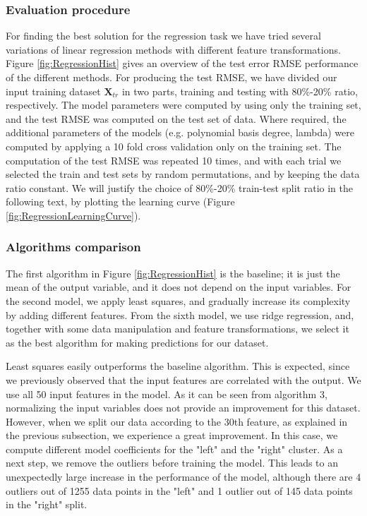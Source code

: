 \documentclass{article} %
\begin{document}
\subsubsection{Evaluation procedure}

For finding the best solution for the regression task we have tried several
variations of linear regression methods with different feature
transformations.
Figure \ref{fig:RegressionHist} gives an overview of the test error RMSE performance of the different methods. 
For producing the test RMSE, we have divided our input training dataset $\mathbf{X}_{tr}$ in two parts, 
training and testing with 80\%-20\% ratio, respectively. 
The model parameters were computed by using only the training set, 
and the test RMSE was computed on the test set of data.
 Where required, the additional parameters of the models (e.g. polynomial basis degree, lambda) 
 were computed by applying a 10 fold cross validation only on the training set. 
 The computation of the test RMSE was repeated 10 times, and with 
 each trial we selected the train and test sets by random permutations, and by
  keeping the data ratio constant. 
  We will justify the choice of 80\%-20\% train-test split ratio in the following text,
   by plotting the learning curve (Figure \ref{fig:RegressionLearningCurve}).

\subsubsection{Algorithms comparison}

The first algorithm in Figure \ref{fig:RegressionHist} is the baseline; 
it is just the mean of the output variable, and it does not depend on the input variables. 
For the second model, we apply least squares, and gradually increase its complexity by adding 
different features. 
From the sixth model, we use ridge regression, 
and, together with some data manipulation and feature transformations, 
we select it as the best algorithm for making predictions for our dataset.

Least squares easily outperforms the baseline algorithm. 
This is expected, since we previously observed that the input features are correlated with the output. 
We use all 50 input features in the model. 
As it can be seen from algorithm 3, normalizing the input variables does not provide an improvement 
for this dataset. However, when we split our data according to the 30th feature, as explained in the 
previous subsection, we experience a great improvement.
 In this case, we compute different model coefficients for the "left" and the "right" cluster.
  As a next step, we remove the outliers before training the model. 
  This leads to an unexpectedly large increase in the performance of the model, 
  although there are 4 outliers out of 1255 data points in the "left" and 1 outlier out of 145 
  data points in the "right" split. %
\end{document}
